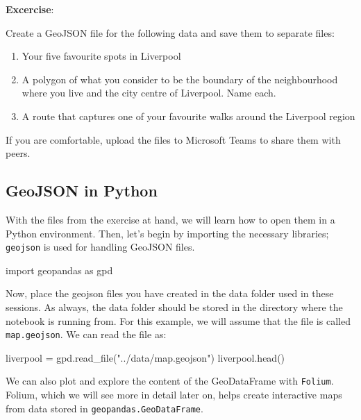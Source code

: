 \documentclass[
  letterpaper,
  DIV=11,
  numbers=noendperiod]{scrreprt}
\newenvironment{Shaded}{\begin{snugshade}}{\end{snugshade}}
\newcommand{\ImportTok}[1]{\textcolor[rgb]{0.00,0.46,0.62}{#1}}
\newcommand{\NormalTok}[1]{\textcolor[rgb]{0.00,0.23,0.31}{#1}}
\newcommand{\OperatorTok}[1]{\textcolor[rgb]{0.37,0.37,0.37}{#1}}
\newcommand{\StringTok}[1]{\textcolor[rgb]{0.13,0.47,0.30}{#1}}
\providecommand{\tightlist}{%
  \setlength{\itemsep}{0pt}\setlength{\parskip}{0pt}}\usepackage{longtable,booktabs,array}
\begin{document}
\textbf{Excercise}:

Create a GeoJSON file for the following data and save them to separate
files:

\begin{enumerate}
\def\labelenumi{\arabic{enumi}.}
\tightlist
\item
  Your five favourite spots in Liverpool
\item
  A polygon of what you consider to be the boundary of the neighbourhood
  where you live and the city centre of Liverpool. Name each.
\item
  A route that captures one of your favourite walks around the Liverpool
  region
\end{enumerate}

If you are comfortable, upload the files to Microsoft Teams to share
them with peers.

\subsection{GeoJSON in Python}\label{geojson-in-python}

With the files from the exercise at hand, we will learn how to open them
in a Python environment. Then, let's begin by importing the necessary
libraries; \texttt{geojson} is used for handling GeoJSON files.

\begin{Shaded}
\begin{Highlighting}[]
\ImportTok{import}\NormalTok{ geopandas }\ImportTok{as}\NormalTok{ gpd}
\end{Highlighting}
\end{Shaded}

Now, place the geojson files you have created in the data folder used in
these sessions. As always, the data folder should be stored in the
directory where the notebook is running from. For this example, we will
assume that the file is called \texttt{map.geojson}. We can read the
file as:

\begin{Shaded}
\begin{Highlighting}[]
\NormalTok{liverpool }\OperatorTok{=}\NormalTok{ gpd.read\_file(}\StringTok{"../data/map.geojson"}\NormalTok{)}
\NormalTok{liverpool.head()}
\end{Highlighting}
\end{Shaded}

We can also plot and explore the content of the GeoDataFrame with
\texttt{Folium}. Folium, which we will see more in detail later on,
helps create interactive maps from data stored in
\texttt{geopandas.GeoDataFrame}.
\end{document}
